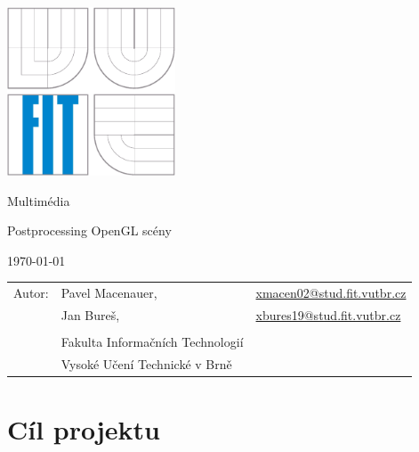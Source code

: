\documentclass[12pt,a4paper,titlepage,final]{report}
\makeatletter
\newcommand\Course{Multimédia}
\newcommand\WorkTitle{Postprocessing OpenGL scény}
\newcommand\AuthorA{Pavel Macenauer}
\newcommand\AuthorB{Jan Bureš}
\newcommand\AuthorAEmail{xmacen02@stud.fit.vutbr.cz}
\newcommand\AuthorBEmail{xbures19@stud.fit.vutbr.cz}
\newcommand\Faculty{Fakulta Informačních Technologií}
\newcommand\School{Vysoké Učení Technické v Brně}
\makeatother
\begin{document}
	\begin{titlepage}
	\begin{center}
		\includegraphics[height=5cm]{images/logo.eps}
	\end{center}
	\vfill
	\begin{center}
		\begin{Large}
			\Course\\
		\end{Large}
		\bigskip
		\begin{Huge}
			\WorkTitle\\
		\end{Huge}
	\end{center}
	\vfill
	\begin{center}
		\begin{large}
			\today
		\end{large}
	\end{center}
	\vfill
	\begin{flushleft}
		\begin{large}
			\begin{tabular}{lll}
				Autor: & \AuthorA, & \url{\AuthorAEmail} \\
				& \AuthorB, & \url{\AuthorBEmail} \\
		
				& & \\
				& \Faculty \\
				& \School \\
			\end{tabular}
		\end{large}
	\end{flushleft}
\end{titlepage}		

	
	
\tableofcontents

\newpage
\section{Cíl projektu}
\end{document}
